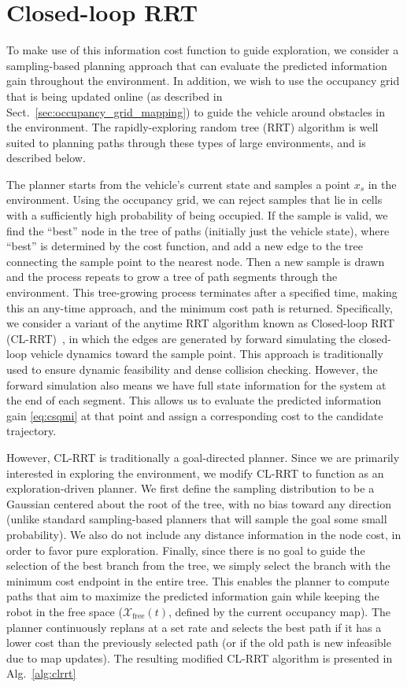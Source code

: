 \section{Closed-loop RRT}
\label{sec:planner}

To make use of this information cost function to guide exploration, we consider a sampling-based planning approach that can evaluate the predicted information gain throughout the environment. In addition, we wish to use the occupancy grid that is being updated online (as described in Sect.~\ref{sec:occupancy_grid_mapping}) to guide the vehicle around obstacles in the environment. The rapidly-exploring random tree (RRT) algorithm is well suited to planning paths through these types of large environments, and is described below. 

The planner starts from the vehicle's current state and samples a point $x_s$ in the environment. Using the occupancy grid, we can reject samples that lie in cells with a sufficiently high probability of being occupied. If the sample is valid, we find the ``best'' node in the tree of paths (initially just the vehicle state), where ``best'' is determined by the cost function, and add a new edge to the tree connecting the sample point to the nearest node.
Then a new sample is drawn and the process repeats to grow a tree of path segments through the environment. This tree-growing process terminates after a specified time, making this an any-time approach, and the minimum cost path is returned. Specifically, we consider a variant of the anytime RRT algorithm known as Closed-loop RRT (CL-RRT)~\cite{Kuwata09_TCST}, in which the edges are generated by forward simulating the closed-loop vehicle dynamics toward the sample point. This approach is traditionally used to ensure dynamic feasibility and dense collision checking. However, the forward simulation also means we have full state information for the system at the end of each segment. This allows us to evaluate the predicted information gain \eqref{eq:csqmi} at that point and assign a corresponding cost to the candidate trajectory.

However, CL-RRT is traditionally a goal-directed planner. Since we are primarily interested in exploring the environment, we modify CL-RRT to function as an exploration-driven planner. We first define the sampling distribution to be a Gaussian centered about the root of the tree, with no bias toward any direction (unlike standard sampling-based planners that will sample the goal some small probability). We also do not include any distance information in the node cost, in order to favor pure exploration. Finally, since there is no goal to guide the selection of the best branch from the tree, we simply select the branch with the minimum cost endpoint in the entire tree. This enables the planner to compute paths that aim to maximize the predicted information gain while keeping the robot in the free space ($\mathcal{X}_\text{free}(t)$, defined by the current occupancy map). The planner continuously replans at a set rate and selects the best path if it has a lower cost than the previously selected path (or if the old path is new infeasible due to map updates). The resulting modified CL-RRT algorithm is presented in Alg.~\ref{alg:clrrt}

